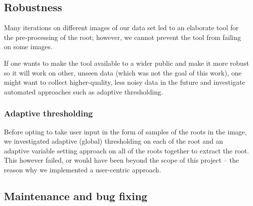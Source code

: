  
\subsection{Robustness}



Many iterations on different images of our data set led to an elaborate tool for the pre-processing of the root; however, we cannot prevent the tool from failing on some images. 

If one wants to make the tool available to a wider public and make it more robust so it will work on other, unseen data (which was not the goal of this work), one might want to collect higher-quality, less noisy data in the future and investigate automated approaches such as adaptive thresholding. 





\subsubsection{Adaptive thresholding}
Before opting to take user input in the form of samples of the roots in the image, we investigated adaptive (global) thresholding on each of the root and an adaptive variable setting approach on all of the roots together to extract the root. This however failed, or would have been beyond the scope of this project -- the reason why we implemented a user-centric approach.


\subsection{Maintenance and bug fixing}

